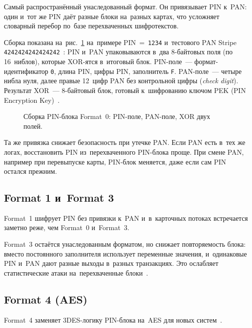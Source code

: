 Самый распространённый унаследованный формат. Он привязывает PIN к~PAN: один
и~тот же PIN даёт разные блоки на~разных картах, что усложняет словарный
перебор по~базе перехваченных шифротекстов.

\begin{sloppypar}
  Сборка показана на~рис.~\ref{fig:pin-block-format0} на~примере
  PIN~=~\texttt{1234} и~тестового PAN Stripe
  \texttt{4242424242424242}~\cite{stripe-testing}: PIN и~PAN упаковываются в~два
  8-байтовых поля (по 16~ниблов), которые XOR-ятся в~итоговый блок. PIN-поле~---
  формат-идентификатор \texttt{0}, длина PIN, цифры PIN, заполнитель \texttt{F}.
  PAN-поле~--- четыре нибла нуля, далее правые 12~цифр PAN без контрольной
  цифры (\textit{check digit}).
  Результат XOR~--- 8-байтовый блок, готовый к~шифрованию ключом PEK (PIN
  Encryption Key)~\cite{iso-9564}.
\end{sloppypar}

\begin{figure}[tbp]
  \centering
  \caption{Сборка PIN-блока Format~0: PIN-поле, PAN-поле, XOR двух
  полей.}\label{fig:pin-block-format0}
\end{figure}

Та же привязка снижает безопасность при утечке PAN. Если PAN есть в~тех же
логах, восстановить PIN из~перехваченного PIN-блока проще. При
смене PAN, например при перевыпуске карты, PIN-блок меняется, даже если сам PIN
остался прежним.

\subsection*{Format 1 и~Format 3}

Format~1 шифрует PIN без привязки к~PAN и~в~карточных потоках встречается
заметно реже, чем Format~0 и~Format~3.

Format~3 остаётся унаследованным форматом, но снижает повторяемость блока:
вместо постоянного заполнителя использует переменные значения, и~одинаковые PIN
и~PAN дают разные выходы в~разных транзакциях. Это ослабляет
статистические атаки на~перехваченные блоки~\cite{iso-9564}.

\subsection*{Format 4 (AES)}

Format~4 заменяет 3DES-логику PIN-блока на~AES для новых
систем~\cite{iso-9564}.

